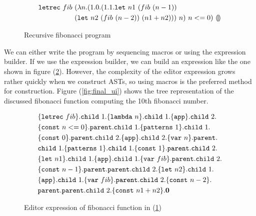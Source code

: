 \begin{figure}[H]
  \small
  \begin{align*}
    \texttt{letrec}~fib~&(\lambda n.(1.0.(1.1.\texttt{let}~n1~(fib~(n-1))~\\
    &{(\texttt{let}~n2~(fib~(n-2))~(n1+n2))})~n)~n<=0)~\llparenthesis\rrparenthesis
  \end{align*}
  \caption{Recursive fibonacci program}
  \label{fig:fibonacciAst}
\end{figure}

We can either write the program by sequencing macros or using the expression
builder. If we use the expression builder, we can build an expression like the
one shown in figure (\ref{fig:fibonacciEdt}). However, the complexity of the
editor expression grows rather quickly when we construct ASTs, so using macros
is the preferred method for construction. Figure (\ref{fig:final_ui}) shows the
tree representation of the discussed fibonacci function computing the 10th
fibonacci number.

\begin{figure}[H]
\small
\begin{align*}
  &\{ \texttt{letrec}~fib \}.\texttt{child}~1.\{ \texttt{lambda}~n \}.\texttt{child}~1.\{ \texttt{app} \}.\texttt{child}~2.\\
  &\{ \texttt{const}~n <= 0 \}.\texttt{parent}.\texttt{child}~1.\{ \texttt{patterns}~1 \}.\texttt{child}~1.\\
  &\{ \texttt{const}~0 \}.\texttt{parent}.\texttt{child}~2.\{ \texttt{app} \}.\texttt{child}~2.\{ \texttt{var}~n \}.\texttt{parent}.\\
  &\texttt{child}~1.\{ \texttt{patterns}~1 \}.\texttt{child}~1.\{ \texttt{const}~1 \}.\texttt{parent}.\texttt{child}~2.\\
  &\{ \texttt{let}~n1 \}.\texttt{child}~1.\{ \texttt{app} \}.\texttt{child}~1.\{ \texttt{var}~fib \}.\texttt{parent}.\texttt{child}~2.\\
  &\{ \texttt{const}~n - 1 \}.\texttt{parent}.\texttt{parent}.\texttt{child}~2.\{ \texttt{let}~n2 \}.\texttt{child}~1.\\
  &\{ \texttt{app} \}.\texttt{child}~1.\{ \texttt{var}~fib \}.\texttt{parent}.\texttt{child}~2.\{ \texttt{const}~n - 2 \}.\\
  &\texttt{parent}.\texttt{parent}.\texttt{child}~2.\{ \texttt{const}~n1 + n2 \}.\mathbf{0}
\end{align*}
\caption{Editor expression of fibonacci function in (\ref{fig:fibonacciAst})}
  \label{fig:fibonacciEdt}
\end{figure}

